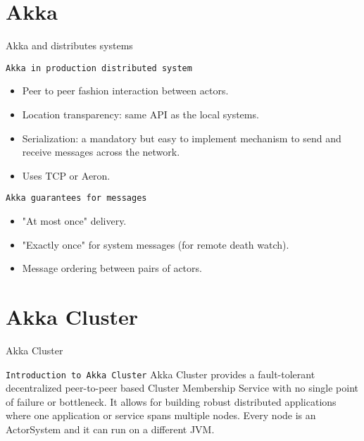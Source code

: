 \documentclass[presentation,apice]{beamer}\mode<presentation>{\usetheme{AMSBolognaFC}}
\begin{document}
\section{Akka}
\begin{frame}[c,fragile]{Akka and distributes systems}
\begin{block}{\texttt{Akka in production distributed system}}
\begin{itemize}
    \item Peer to peer fashion interaction between actors.
    \item Location transparency: same API as the local systems.
    \item Serialization: a mandatory but easy to implement mechanism to send and receive messages across the network.
    \item Uses TCP or Aeron.
\end{itemize}
\end{block}

\begin{block}{\texttt{Akka guarantees for messages}}
\begin{itemize}
    \item "At most once" delivery.
    \item "Exactly once" for system messages (for remote death watch).
    \item Message ordering between pairs of actors.
\end{itemize}

\end{block}
\end{frame}
\section{Akka Cluster}
\begin{frame}[c,fragile]{Akka Cluster}
%
\begin{block}{\texttt{Introduction to Akka Cluster}}
Akka Cluster provides a fault-tolerant decentralized peer-to-peer based Cluster Membership Service with no single point of failure or bottleneck.
It allows for building robust distributed applications where one application or service spans multiple nodes. Every node is an ActorSystem and it can run on a different JVM.
\end{block}

\end{frame}
\end{document}
